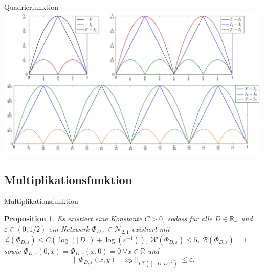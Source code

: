 \documentclass[10pt,aspectratio=169]{beamer}
\theoremstyle{plain} %
\newtheorem{proposition}[theorem]{Proposition}
\theoremstyle{remark} %
\newcommand{\R}{\mathbb{R}} %
\newcommand{\norm}[1]{\|#1\|}
\begin{document}
\begin{frame}{Quadrierfunktion}
    \centering
    \includegraphics[height=0.9\textheight]{images/approximation-proposition-6.png}
\end{frame}

\subsection{Multiplikationsfunktion}

\begin{frame}{Multiplikationsfunktion}
    \begin{proposition} %
        Es existiert eine Konstante \(C>0\), sodass für alle \(D\in \R_+\) und \(\varepsilon \in (0, 1/2)\) 
        ein Netzwerk \(\Phi_{D,\varepsilon} \in \mathcal{N}_{2,1}\) existiert mit 
        \(\mathcal{L}(\Phi_{D, \varepsilon}) \leq C (\log(\lceil D \rceil) + \log(\varepsilon^{-1})) \), 
        \(\mathcal{W}(\Phi_{D, \varepsilon}) \leq 5\), \(\mathcal{B}(\Phi_{D, \varepsilon}) = 1\) sowie 
        \(\Phi_{D,\varepsilon}(0,x) = \Phi_{D,\varepsilon}(x,0) = 0 \;\forall x\in \R\) und 
        \[ \norm{\Phi_{D,\varepsilon}(x,y) - xy}_{L^\infty([-D,D]^2)} \leq \varepsilon. \]
    \end{proposition}
\end{frame}
\end{document}
